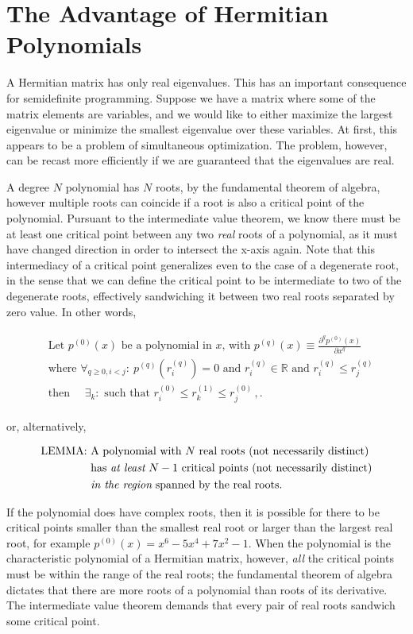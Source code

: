 \documentclass[
  12pt          %
  ,letterpaper  %
  ,center       %
  ,noupper      %
  ,english,fleqn]{uconnthesis}
\let\stdsection\section
\renewcommand\section{\newpage\stdsection}
\newcommand{\LeftEqns}[1]{\begin{fleqn}[\leftmargini minus \leftmargini]\begin{align}#1\end{align}\end{fleqn}}
\newcommand{\LeftEqn}[1]{\LeftEqns{\begin{split}#1\end{split}}}
\begin{document}
\section{The Advantage of Hermitian Polynomials}
A Hermitian matrix has only real eigenvalues. This has an important consequence for semidefinite programming. Suppose we have a matrix where some of the matrix elements are variables, and we would like to either maximize the largest eigenvalue or minimize the smallest eigenvalue over these variables. At first, this appears to be a problem of simultaneous optimization. The problem, however, can be recast more efficiently if we are guaranteed that the eigenvalues are real.

A degree $N$ polynomial has $N$ roots, by the fundamental theorem of algebra, however multiple roots can coincide if a root is also a critical point of the polynomial. Pursuant to the intermediate value theorem, we know there must be at least one critical point between any two {\em real} roots of a polynomial, as it must have changed direction in order to intersect the x-axis again. Note that this intermediacy of a critical point generalizes even to the case of a degenerate root, in the sense that we can define the critical point to be intermediate to two of the degenerate roots, effectively sandwiching it between two real roots separated by zero value. In other words,
\LeftEqn{\label{eq:polydef}
&\text{Let } p^{(0)}(x) \text{ be a polynomial in $x$}\text{, with }p^{(q)}(x) \equiv \frac{\partial^q p^{(0)}(x)}{\partial x^q}
\\&\text{where }\forall_{q\geq 0,i< j} :\: p^{(q)}\left(r^{(q)}_i\right) = 0 \text{ and } r^{(q)}_i \in \mathbb{R}  \text{ and } r^{(q)}_i \leq r^{(q)}_j
\\&\text{then }\quad \exists_k:\text{ such that }r^{(0)}_i \leq r^{(1)}_k \leq r^{(0)}_j \,,.
}
or, alternatively,
\LeftEqn{
\text{LEMMA:  }&\text{A polynomial with $N$ real roots (not necessarily distinct)}
\\&\text{has {\em at least} $N-1$ critical points (not necessarily distinct)}
\\&\text{{\em in the region} spanned by the real roots.}
}
If the polynomial does have complex roots, then it is possible for there to be critical points smaller than the smallest real root or larger than the largest real root, for example $p^{(0)}(x)=x^6-5x^4+7x^2-1$. When the polynomial is the characteristic polynomial of a Hermitian matrix, however, {\em all} the critical points must be within the range of the real roots; the fundamental theorem of algebra dictates that there are more roots of a polynomial than roots of its derivative. The intermediate value theorem demands that every pair of real roots sandwich some critical point.
\end{document}
